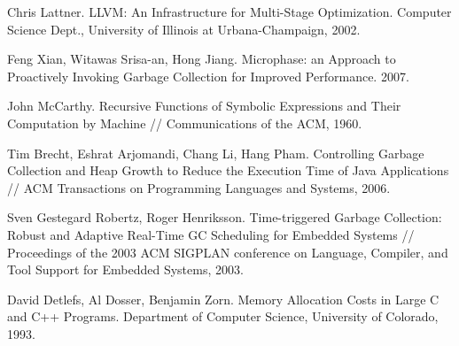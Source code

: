 \begin{thebibliography}{99}

Chris Lattner. LLVM: An Infrastructure for Multi-Stage Optimization.
Computer Science Dept., University of Illinois at Urbana-Champaign, 2002.

Feng Xian, Witawas Srisa-an, Hong Jiang.
Microphase: an Approach to Proactively Invoking Garbage Collection for Improved 
Performance. 2007.

John McCarthy.
Recursive Functions of Symbolic Expressions and Their Computation by Machine //
Communications of the ACM, 1960.

Tim Brecht, Eshrat Arjomandi, Chang Li, Hang Pham.
Controlling Garbage Collection and Heap Growth to Reduce the Execution Time 
of Java Applications // ACM Transactions on Programming Languages and Systems,
2006.

Sven Gestegard Robertz, Roger Henriksson.
Time-triggered Garbage Collection: Robust and Adaptive Real-Time GC Scheduling 
for Embedded Systems //
Proceedings of the 2003 ACM SIGPLAN conference 
on Language, Compiler, and Tool Support for Embedded Systems, 2003.

David Detlefs, Al Dosser, Benjamin Zorn.
Memory Allocation Costs in Large C and C++ Programs.
Department of Computer Science, University of Colorado, 1993.
\end{thebibliography}
